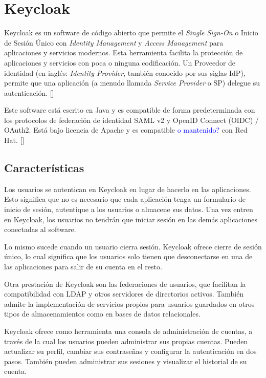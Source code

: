 \section{Keycloak}
Keycloak es un software de código abierto que permite el \textit{Single Sign-On} o Inicio de Sesión Único con \textit{Identity Management} y \textit{Access Management} para aplicaciones y servicios modernos. Esta herramienta facilita la protección de aplicaciones y servicios con poca o ninguna codificación. Un Proveedor de identidad (en inglés: \textit{Identity Provider}, también conocido por sus siglas IdP), permite que una aplicación (a menudo llamada \textit{Service Provider} o SP) delegue su autenticación. [\cite{KeycloakDoc}]

Este software está escrito en Java y es compatible de forma predeterminada con los protocolos de federación de identidad SAML v2 y OpenID Connect (OIDC) / OAuth2. Está bajo licencia de Apache y es compatible \textcolor{blue}{o mantenido?} con Red Hat. [\cite{KeycloakDoc}]

	\subsection{Características}
	Los usuarios se autentican en Keycloak en lugar de hacerlo en las aplicaciones. Esto significa que no es necesario que cada aplicación tenga un formulario de inicio de sesión, autentique a los usuarios o almacene sus datos. Una vez entren en Keycloak, los usuarios no tendrán que iniciar sesión en las demás aplicaciones conectadas al software.
	
	Lo mismo sucede cuando un usuario cierra sesión. Keycloak ofrece cierre de sesión único, lo cual significa que los usuarios solo tienen que desconectarse en una de las aplicaciones para salir de su cuenta en el resto. 
	
	Otra prestación de Keycloak son las federaciones de usuarios, que facilitan la compatibilidad con LDAP y otros servidores de directorios activos. También admite la implementación de servicios propios para usuarios guardados en otros tipos de almacenamientos como en bases de datos relacionales. 
	
	Keycloak ofrece como herramienta una consola de administración de cuentas, a través de la cual los usuarios pueden administrar sus propias cuentas. Pueden actualizar su perfil, cambiar sus contraseñas y configurar la autenticación en dos pasos. También pueden administrar sus sesiones y visualizar el historial de su cuenta. 
	
